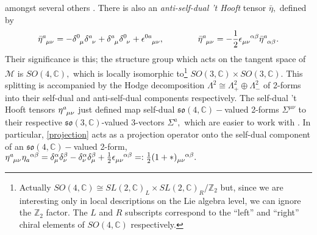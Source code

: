\documentclass[a4paper,12pt, onecolumn, notitlepage]{article}
\theoremstyle{definition}
\theoremstyle{remark}
\newcommand{\al}{\alpha}
\newcommand{\m}{\mu}
\newcommand{\n}{\nu}
\newcommand{\e}{\epsilon}
\newcommand{\hooft}[3]{\eta\indices{^{#1}_{#2}_{#3}}}
\newcommand{\ihooft}[3]{\eta\indices{_{#1}^{#2}^{#3}}}
\begin{document}
amongst several others \cite{hooft_1976}. There is also an \emph{anti-self-dual 't Hooft} tensor $\bar{\eta},$ defined by
\begin{equation}
\label{asdhooft}
\bar{\eta}\indices{^a_\m_\n} =  -\delta\indices{^0_\mu}\delta\indices{^a_\nu} + \delta\indices{^a_\mu}\delta\indices{^0_\nu} + \epsilon\indices{^0^a_\mu_\nu},\qquad\qquad\bar{\eta}\indices{^a_\m_\n}=-\frac{1}{2}\e\indices{_\m_\n^\al^\beta}\bar{\eta}\indices{^a_\al_\beta}.\\
\end{equation}
Their significance is this; the structure group which acts on the tangent space of $\mathcal{M}$ is $SO(4,\mathbb{C}),$ which is locally isomorphic to\footnote{Actually $SO(4,\mathbb{C}) \cong SL(2,\mathbb{C})_{L}\times SL(2,\mathbb{C})_{R}/\mathbb{Z}_{2}$ but, since we are interesting only in local descriptions on the Lie algebra level, we can ignore the $\mathbb{Z}_{2}$ factor. The $L$ and $R$ subscripts correspond to the ``left'' and ``right'' chiral elements of $SO(4,\mathbb{C})$ respectively.} $SO(3,\mathbb{C})\times SO(3,\mathbb{C}).$ This splitting is accompanied by the Hodge decomposition $\Lambda^{2}\cong\Lambda_{+}^{2}\oplus\Lambda^{2}_{-}$ of 2-forms into their self-dual and anti-self-dual components respectively. The self-dual 't Hooft tensors $\hooft{a}{\m}{\n}$ just defined map self-dual $\mathfrak{so}(4,\mathbb{C})-$valued 2-forms $\Sigma^{\m\n}$ to their respective $\mathfrak{so}(3,\mathbb{C})$-valued 3-vectors $\Sigma^{a},$ which are easier to work with \cite{hooft_1976}. In particular, \cref{projection} acts as a projection operator onto the self-dual component of an $\mathfrak{so}(4,\mathbb{C})-$valued 2-form, $\hooft{a}{\m}{\n}\ihooft{a}{\al}{\beta} = \delta^{\al}_{\m}\delta^{\beta}_{\n} - \delta^{\al}_{\n}\delta^{\beta}_{\m} +\frac{1}{2}\e\indices{_\m_\n^\al^\beta} =: \frac{1}{2}(1+\ast)\indices{_\m_\n^\al^\beta}.$\\
\end{document}
